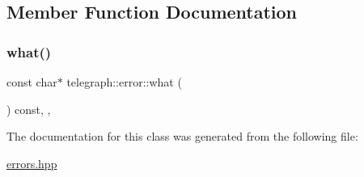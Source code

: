 \subsection{Member Function Documentation}
\mbox{\label{classtelegraph_1_1error_acd75a8954a9d693faf75eb5918bfe044}} 
\subsubsection{\texorpdfstring{what()}{what()}}
{\footnotesize\ttfamily const char$\ast$ telegraph\+::error\+::what (\begin{DoxyParamCaption}{ }\end{DoxyParamCaption}) const\hspace{0.3cm}{\ttfamily [inline]}, {\ttfamily [override]}, {\ttfamily [noexcept]}}



The documentation for this class was generated from the following file\+:\begin{DoxyCompactItemize}
\item 
\hyperlink{errors_8hpp}{errors.\+hpp}\end{DoxyCompactItemize}
